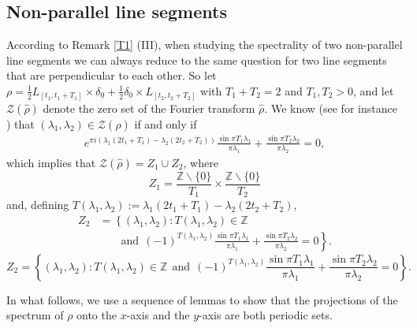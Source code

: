 \documentclass[12pt,a4paper,intlimits,sumlimits]{amsart}
\theoremstyle{plain}
\theoremstyle{definition}
\begin{document}
\subsection{Non-parallel line segments}
According to Remark \ref{T1}  (III), when studying the spectrality of two non-parallel line segments we can always reduce to the same question for two line segments that are perpendicular to each other. So let $\rho=\frac{1}{2}L_{[t_1, t_1+T_1]}\times\delta_0+\frac{1}{2}\delta_0\times L_{[t_2, t_2+T_2]}$ with $T_1+T_2=2$ and  $T_1, T_2>0$, and let $\mathcal{Z}\left(\hat{\rho}\right)$ denote the zero set of the Fourier transform $\hat{\rho}$. We know (see for instance \cite{kolountzakis2025spectrality}) that $\left(\lambda_1, \lambda_2\right) \in \mathcal{Z}\left(\hat{\rho}\right)$ if and only if
\begin{align}\label{line1}
e^{\pi i \left(\lambda_1\left(2 t_1+T_1\right)-\lambda_2\left(2 t_2+T_2\right)\right)} \frac{\sin \pi T_1\lambda_1}{\pi \lambda_1}+\frac{\sin \pi T_2\lambda_2}{\pi \lambda_2}=0,
\end{align}
which implies that $ \mathcal{Z}\left(\hat{\rho}\right)=Z_1\cup Z_2$, where
$$
Z_1=   \frac{ \mathbb{Z} \backslash\{0\}}{T_1}\times\frac{ \mathbb{Z} \backslash\{0\}}{T_2}$$
and, defining $T\left(\lambda_1, \lambda_2\right):=\lambda_1\left(2 t_1+T_1\right)-\lambda_2\left(2 t_2+T_2\right)$,
\ifdefined\SMART
\begin{align*}
Z_2 &= \left\{(\lambda_1, \lambda_2 ): T\left(\lambda_1, \lambda_2\right) \in \mathbb{Z}\right.\\
&\left.\hspace{2em}\text{and}\ \  (-1)^{T\left(\lambda_1, \lambda_2\right)} \frac{\sin \pi T_1\lambda_1}{\pi \lambda_1}+\frac{\sin \pi T_2\lambda_2}{\pi \lambda_2}=0\right\}.
\end{align*}
\else
$$
Z_2 = \left\{(\lambda_1, \lambda_2 ): T\left(\lambda_1, \lambda_2\right) \in \mathbb{Z} \ \ \text{and}\ \  (-1)^{T\left(\lambda_1, \lambda_2\right)} \frac{\sin \pi T_1\lambda_1}{\pi \lambda_1}+\frac{\sin \pi T_2\lambda_2}{\pi \lambda_2}=0\right\}.
$$
\fi

 In what follows, we use a sequence of lemmas to show that the projections of the spectrum of $\rho$ onto the $x$-axis and the $y$-axis are both periodic sets. 
\end{document}
